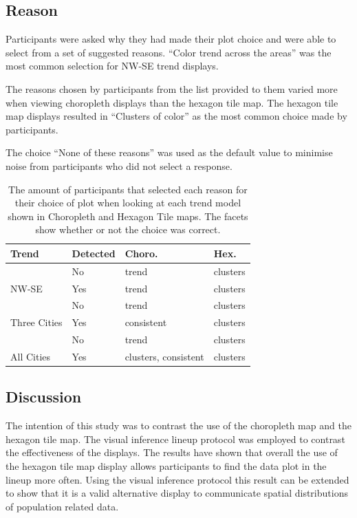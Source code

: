 \documentclass[12pt]{article}
\begin{document}
\subsection{Reason}
\label{sec:rea}

Participants were asked why they had made their plot choice and were
able to select from a set of suggested reasons. ``Color trend across the
areas'' was the most common selection for NW-SE trend displays.

The reasons chosen by participants from the list provided to them varied
more when viewing choropleth displays than the hexagon tile map. The
hexagon tile map displays resulted in ``Clusters of color'' as the most
common choice made by participants.

The choice ``None of these reasons'' was used as the default value to
minimise noise from participants who did not select a response.

\begin{table}

\caption{\label{tab:reason}The amount of participants that selected each reason for their choice of plot when looking at each trend model shown in Choropleth and Hexagon Tile maps. The facets show whether or not the choice was correct.}
\centering
\begin{tabular}[t]{llll}
\toprule
Trend & Detected & Choro. & Hex.\\
\midrule
 & No & trend & clusters\\
\cmidrule{2-4}
\multirow{-2}{*}{\raggedright\arraybackslash NW-SE} & Yes & trend & clusters\\
\cmidrule{1-4}
 & No & trend & clusters\\
\cmidrule{2-4}
\multirow{-2}{*}{\raggedright\arraybackslash Three Cities} & Yes & consistent & clusters\\
\cmidrule{1-4}
 & No & trend & clusters\\
\cmidrule{2-4}
\multirow{-2}{*}{\raggedright\arraybackslash All Cities} & Yes & clusters, consistent & clusters\\
\bottomrule
\end{tabular}
\end{table}

\subsection{Discussion}
\label{sec:dis}

The intention of this study was to contrast the use of the choropleth
map and the hexagon tile map. The visual inference lineup protocol was
employed to contrast the effectiveness of the displays. The results have
shown that overall the use of the hexagon tile map display allows
participants to find the data plot in the lineup more often. Using the
visual inference protocol this result can be extended to show that it is
a valid alternative display to communicate spatial distributions of
population related data.
\end{document}

